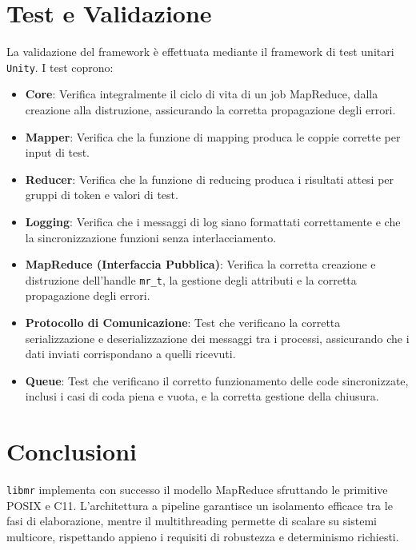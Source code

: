 \documentclass[12pt,a4paper]{article}
\begin{document}
\section{Test e Validazione}
La validazione del framework è effettuata mediante il framework di test unitari \texttt{Unity}. I test coprono:
\begin{itemize}
    \item \textbf{Core}: Verifica integralmente il ciclo di vita di un job MapReduce, dalla creazione alla distruzione, assicurando la corretta propagazione degli errori.
    \item \textbf{Mapper}: Verifica che la funzione di mapping produca le coppie corrette per input di test.
    \item \textbf{Reducer}: Verifica che la funzione di reducing produca i risultati attesi per gruppi di token e valori di test.
    \item \textbf{Logging}: Verifica che i messaggi di log siano formattati correttamente e che la sincronizzazione funzioni senza interlacciamento.
    \item \textbf{MapReduce (Interfaccia Pubblica)}: Verifica la corretta creazione e distruzione dell'handle \texttt{mr\_t}, la gestione degli attributi e la corretta propagazione degli errori.
    \item \textbf{Protocollo di Comunicazione}: Test che verificano la corretta serializzazione e deserializzazione dei messaggi tra i processi, assicurando che i dati inviati corrispondano a quelli ricevuti.
    \item \textbf{Queue}: Test che verificano il corretto funzionamento delle code sincronizzate, inclusi i casi di coda piena e vuota, e la corretta gestione della chiusura.
\end{itemize}

\section{Conclusioni}
\texttt{libmr} implementa con successo il modello MapReduce sfruttando le primitive POSIX e C11. L'architettura a pipeline garantisce un isolamento efficace tra le fasi di elaborazione, mentre il multithreading permette di scalare su sistemi multicore, rispettando appieno i requisiti di robustezza e determinismo richiesti.
\end{document}
